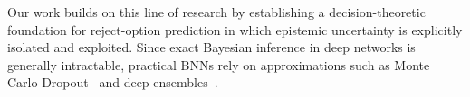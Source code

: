 \vspace{-0.15cm}

Our work builds on this line of research by establishing a decision-theoretic foundation for reject-option prediction in which epistemic uncertainty is explicitly isolated and exploited. Since exact Bayesian inference in deep networks is generally intractable, practical BNNs rely on approximations such as Monte Carlo Dropout~\cite{Gal-Dropout-ICML2016} and deep ensembles~\cite{Lakshminarayanan-Ensembles-NIPS2017}. 

